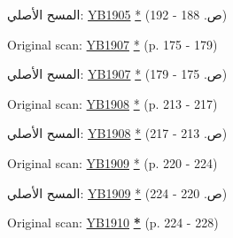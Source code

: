 المسح الأصلي: \href{https://documents.adventistarchives.org/Yearbooks/YB1905.pdf#search=Yearbook%201905}{YB1905} \href{https://forgotten-pillar.s3.us-east-2.amazonaws.com/YB1905.pdf}{*} (ص. 188 - 192)






Original scan: \href{https://documents.adventistarchives.org/Yearbooks/YB1907.pdf#search=Yearbook%201906}{YB1907} \href{https://forgotten-pillar.s3.us-east-2.amazonaws.com/YB1907.pdf}{*} (p. 175 - 179)


المسح الأصلي: \href{https://documents.adventistarchives.org/Yearbooks/YB1907.pdf#search=Yearbook%201906}{YB1907} \href{https://forgotten-pillar.s3.us-east-2.amazonaws.com/YB1907.pdf}{*} (ص. 175 - 179)






Original scan: \href{https://documents.adventistarchives.org/Yearbooks/YB1908.pdf#search=Yearbook%201906}{YB1908} \href{https://forgotten-pillar.s3.us-east-2.amazonaws.com/YB1908.pdf}{*} (p. 213 - 217)


المسح الأصلي: \href{https://documents.adventistarchives.org/Yearbooks/YB1908.pdf#search=Yearbook%201906}{YB1908} \href{https://forgotten-pillar.s3.us-east-2.amazonaws.com/YB1908.pdf}{*} (ص. 213 - 217)






Original scan: \href{https://documents.adventistarchives.org/Yearbooks/YB1909.pdf#search=Yearbook%201909}{YB1909} \href{https://forgotten-pillar.s3.us-east-2.amazonaws.com/YB1909.pdf}{*} (p. 220 - 224)


المسح الأصلي: \href{https://documents.adventistarchives.org/Yearbooks/YB1909.pdf#search=Yearbook%201909}{YB1909} \href{https://forgotten-pillar.s3.us-east-2.amazonaws.com/YB1909.pdf}{*} (ص. 220 - 224)






Original scan: \href{https://documents.adventistarchives.org/Yearbooks/YB1910.pdf#search=Yearbook%201910}{YB1910} \textbf{\href{https://forgotten-pillar.s3.us-east-2.amazonaws.com/YB1910.pdf}{*}} (p. 224 - 228)



